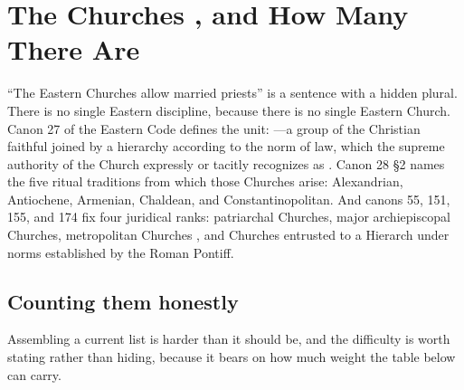 \section{The Churches , and How Many There Are}

``The Eastern Churches allow married priests'' is a sentence with a hidden plural. There is no single Eastern discipline, because there is no single Eastern Church. Canon 27 of the Eastern Code defines the unit: ---a group of the Christian faithful joined by a hierarchy according to the norm of law, which the supreme authority of the Church expressly or tacitly recognizes as . Canon 28 §2 names the five ritual traditions from which those Churches arise: Alexandrian, Antiochene, Armenian, Chaldean, and Constantinopolitan. And canons 55, 151, 155, and 174 fix four juridical ranks: patriarchal Churches, major archiepiscopal Churches, metropolitan Churches , and Churches  entrusted to a Hierarch under norms established by the Roman Pontiff.

\subsection{Counting them honestly}

Assembling a current list is harder than it should be, and the difficulty is worth stating rather than hiding, because it bears on how much weight the table below can carry.

